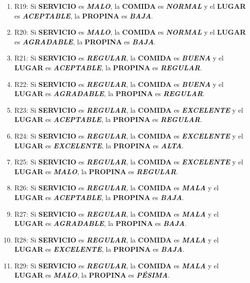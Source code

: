 \documentclass[11pt, letterpaper]{article}
\begin{document}
\begin{enumerate}
	\item R19: Si \textbf{SERVICIO} es \textbf{\textit{MALO}}, la \textbf{COMIDA} es \textbf{\textit{NORMAL}} y el \textbf{LUGAR} es \textbf{\textit{ACEPTABLE}}, la \textbf{PROPINA} es \textbf{\textit{BAJA}}.
	\item R20: Si \textbf{SERVICIO} es \textbf{\textit{MALO}}, la \textbf{COMIDA} es \textbf{\textit{NORMAL}} y el \textbf{LUGAR} es \textbf{\textit{AGRADABLE}}, la \textbf{PROPINA} es \textbf{\textit{BAJA}}.
	\item R21: Si \textbf{SERVICIO} es \textbf{\textit{REGULAR}}, la \textbf{COMIDA} es \textbf{\textit{BUENA}} y el \textbf{LUGAR} es \textbf{\textit{ACEPTABLE}}, la \textbf{PROPINA} es \textbf{\textit{REGULAR}}.
	\item R22: Si \textbf{SERVICIO} es \textbf{\textit{REGULAR}}, la \textbf{COMIDA} es \textbf{\textit{BUENA}} y el \textbf{LUGAR} es \textbf{\textit{AGRADABLE}}, la \textbf{PROPINA} es \textbf{\textit{REGULAR}}.
	\item R23: Si \textbf{SERVICIO} es \textbf{\textit{REGULAR}}, la \textbf{COMIDA} es \textbf{\textit{EXCELENTE}} y el \textbf{LUGAR} es \textbf{\textit{ACEPTABLE}}, la \textbf{PROPINA} es \textbf{\textit{REGULAR}}.
	\item R24: Si \textbf{SERVICIO} es \textbf{\textit{REGULAR}}, la \textbf{COMIDA} es \textbf{\textit{EXCELENTE}} y el \textbf{LUGAR} es \textbf{\textit{EXCELENTE}}, la \textbf{PROPINA} es \textbf{\textit{ALTA}}.
	\item R25: Si \textbf{SERVICIO} es \textbf{\textit{REGULAR}}, la \textbf{COMIDA} es \textbf{\textit{EXCELENTE}} y el \textbf{LUGAR} es \textbf{\textit{MALO}}, la \textbf{PROPINA} es \textbf{\textit{REGULAR}}.
	\item R26: Si \textbf{SERVICIO} es \textbf{\textit{REGULAR}}, la \textbf{COMIDA} es \textbf{\textit{MALA}} y el \textbf{LUGAR} es \textbf{\textit{ACEPTABLE}}, la \textbf{PROPINA} es \textbf{\textit{BAJA}}.
	\item R27: Si \textbf{SERVICIO} es \textbf{\textit{REGULAR}}, la \textbf{COMIDA} es \textbf{\textit{MALA}} y el \textbf{LUGAR} es \textbf{\textit{AGRADABLE}}, la \textbf{PROPINA} es \textbf{\textit{BAJA}}.
	\item R28: Si \textbf{SERVICIO} es \textbf{\textit{REGULAR}}, la \textbf{COMIDA} es \textbf{\textit{MALA}} y el \textbf{LUGAR} es \textbf{\textit{EXCELENTE}}, la \textbf{PROPINA} es \textbf{\textit{BAJA}}.
	\item R29: Si \textbf{SERVICIO} es \textbf{\textit{REGULAR}}, la \textbf{COMIDA} es \textbf{\textit{MALA}} y el \textbf{LUGAR} es \textbf{\textit{MALO}}, la \textbf{PROPINA} es \textbf{\textit{PÉSIMA}}.

\end{enumerate}
\end{document}
